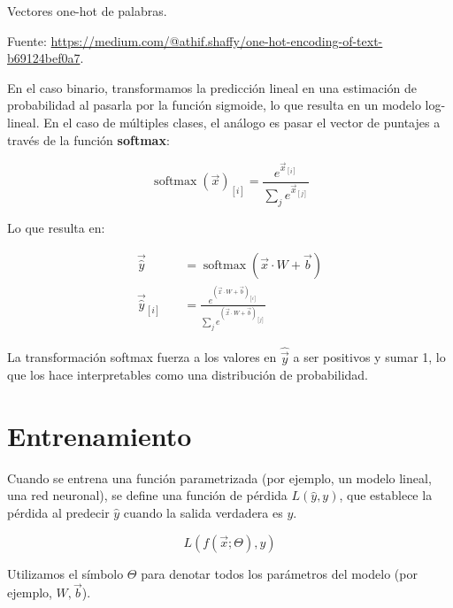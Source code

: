 Vectores one-hot de palabras.

Fuente: \url{https://medium.com/@athif.shaffy/one-hot-encoding-of-text-b69124bef0a7}.

En el caso binario, transformamos la predicción lineal en una estimación de probabilidad al pasarla por la función sigmoide, lo que resulta en un modelo log-lineal. En el caso de múltiples clases, el análogo es pasar el vector de puntajes a través de la función \textbf{softmax}:

\begin{equation}
 \operatorname{softmax}(\vec{x})_{[i]} = \frac{e^{\vec{x}_{[i]}}}{\sum_j e^{\vec{x}_{[j]}}}
\end{equation}

Lo que resulta en:

\begin{equation}
\begin{split}
\vec{\hat{y}} \quad & =  \operatorname{softmax}(\vec{x} \cdot W + \vec{b})  \\
\vec{\hat{y}}_{[i]} \quad & = \frac{e^{(\vec{x} \cdot W + \vec{b})_{[i]}}}{\sum_j e^{(\vec{x} \cdot W + \vec{b})_{[j]}}}
\end{split}
\end{equation}

La transformación softmax fuerza a los valores en $\hat{\vec{y}}$ a ser positivos y sumar 1, lo que los hace interpretables como una distribución de probabilidad.

\section{Entrenamiento}
Cuando se entrena una función parametrizada (por ejemplo, un modelo lineal, una red neuronal), se define una función de pérdida $L(\hat{y}, y)$, que establece la pérdida al predecir $\hat{y}$ cuando la salida verdadera es $y$.

\begin{displaymath}
L(f(\vec{x};\Theta), y)
\end{displaymath}

Utilizamos el símbolo $\Theta$ para denotar todos los parámetros del modelo (por ejemplo, $W, \vec{b}$).

